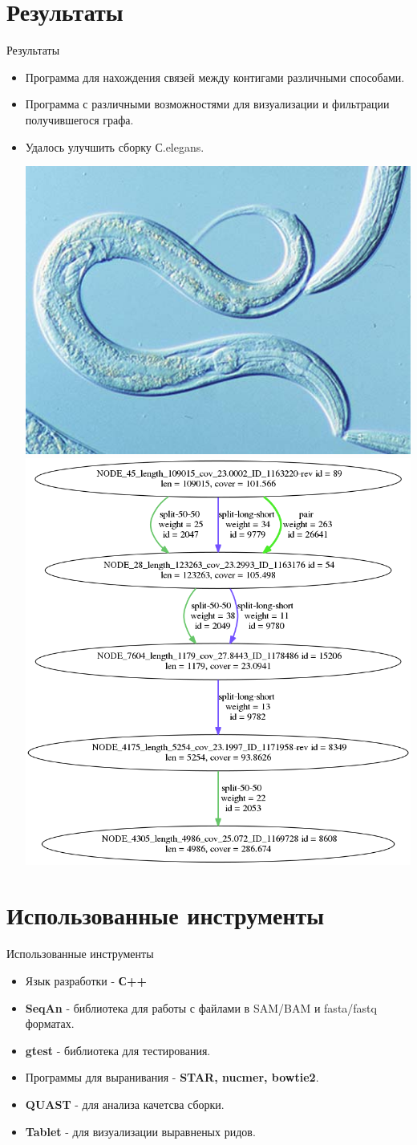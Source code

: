 \documentclass{beamer}
\begin{document}
\section{Результаты}
\begin{frame}[t]{Результаты}
	\begin{itemize}
		\item Программа для нахождения связей
		между контигами различными способами. 
		\item Программа с различными возможностями для 
		визуализации и фильтрации получившегося графа. 
		\item Удалось улучшить сборку С.elegans.
		\begin{center}
		\includegraphics[width=0.35\linewidth]{celegans.jpg}
		\includegraphics[width=0.35\linewidth]{celegExmp.png}
		\end{center}
	\end{itemize}
\end{frame}

\section{Использованные инструменты}
\begin{frame}[t]{Использованные инструменты}
\begin{itemize}
	\item Язык разработки - \textbf{С++}
	\item \textbf{SeqAn} - библиотека для работы с 
	файлами в SAM/BAM и fasta/fastq форматах.  
	\item \textbf{gtest} - библиотека для тестирования.
	\item Программы для выранивания - \textbf{STAR, nucmer, bowtie2}. 
	\item \textbf{QUAST} - для анализа качетсва сборки. 
	\item \textbf{Tablet} - для визуализации выравненых ридов. 
\end{itemize}
\end{frame}
\end{document}
